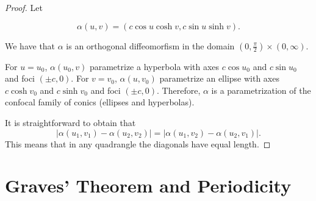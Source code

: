 \begin{proof} Let 

\[\alpha(u,v)=(c\cos u\cosh v, c\sin u\sinh v).\]

We have that $\alpha$ is an orthogonal  diffeomorfism in the domain $(0,\frac{\pi}{2})\times (0,\infty)$.

For $u=u_0$, $\alpha(u_0,v)$ parametrize a  hyperbola with axes $c\cos u_0$ and $ c\sin u_0$ and foci $(\pm c,0)$.
For $v=v_0$, $\alpha(u ,v_0)$ parametrize an ellipse with axes $c\cosh{ v_0}$ and $c\sinh{ v_0}$ and foci $(\pm c,0)$. Therefore, $\alpha$ is a parametrization  of the  confocal family of conics (ellipses and hyperbolas).

It is straightforward to obtain that
\[ 
|\alpha(u_1,v_1)-\alpha(u_2,v_2)|=|\alpha(u_1,v_2)-\alpha(u_2,v_1)|.\]
This means that in any quadrangle the diagonals have equal length.
\end{proof}



\section{Graves' Theorem and Periodicity}

